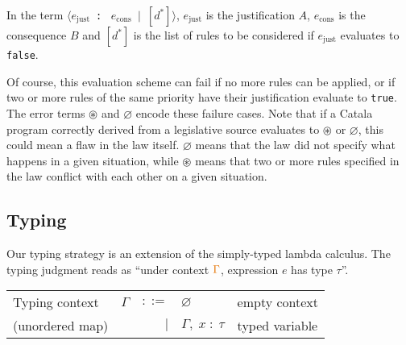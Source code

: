 \documentclass[11pt,a4paper]{article}
\newcommand{\synvar}[1]{\ensuremath{#1}}
\newcommand{\synkeyword}[1]{\textcolor{red!60!black}{\texttt{#1}}}
\newcommand{\synpunct}[1]{\textcolor{black!40!white}{\texttt{#1}}}
\newcommand{\synjust}{~\synpunct{:\raisebox{-0.9pt}{-}}~}
\newcommand{\syntrue}{\synkeyword{true}}
\newcommand{\synfalse}{\synkeyword{false}}
\newcommand{\synlangle}{\synpunct{$\langle$}}
\newcommand{\synrangle}{\synpunct{$\rangle$}}
\newcommand{\synmid}{\synpunct{~$|$~}}
\newcommand{\synemptydefault}{\synvar{\varnothing}}
\newcommand{\synerror}{\synvar{\circledast}}
\newcommand{\syndef}{$ ::= $}
\newcommand{\synalt}{\;$|$\;}
\newcommand{\typctx}[1]{\textcolor{orange!90!black}{\ensuremath{#1}}}
\newcommand{\typempty}{\typctx{\varnothing}}
\newcommand{\typcomma}{\typctx{,\;}}
\newcommand{\typvdash}{\typctx{\;\vdash\;}}
\newcommand{\typcolon}{\typctx{\;:\;}}
\begin{document}
In the term \synlangle\synvar{e_{\text{just}}}\synjust
\synvar{e_{\text{cons}}}\synmid $[\synvar{d}^*]$\synrangle, \synvar{e_{\text{just}}} 
is the justification $A$, \synvar{e_{\text{cons}}} is the consequence $B$ and 
$[\synvar{d}^*]$ is the list of rules to be considered if \synvar{e_{\text{just}}} 
evaluates to \synfalse{}. 
 
Of course, this evaluation scheme can fail if no more 
rules can be applied, or if two or more rules of the same priority have their 
justification evaluate to \syntrue{}. The error terms \synerror{} and \synemptydefault{}
encode these failure cases. Note that if a Catala program correctly derived from a legislative 
source evaluates to \synerror{} or \synemptydefault{}, this could mean a flaw in the 
law itself. \synemptydefault{} means that the law did not specify what happens 
in a given situation, while \synerror{} means that two or more rules specified in 
the law conflict with each other on a given situation.

\subsection{Typing}
\label{sec:defaultcalc:typing}

Our typing strategy is an extension of the simply-typed lambda calculus.
The typing judgment \fbox{$\typctx{\Gamma}\typvdash\synvar{e}\typcolon\synvar{\tau}$} reads as
\enquote{under context $\typctx{\Gamma}$, expression $\synvar{e}$ has type $\synvar{\tau}$}.
\begin{center}
  \begin{tabular}{lrrll}
    Typing context&\typctx{\Gamma}&\syndef&\typempty&empty context\\
    (unordered map)&&\synalt&\typctx{\Gamma}\typcomma\synvar{x}\typcolon\synvar{\tau}&typed variable\\
  \end{tabular}
\end{center}
\end{document}
